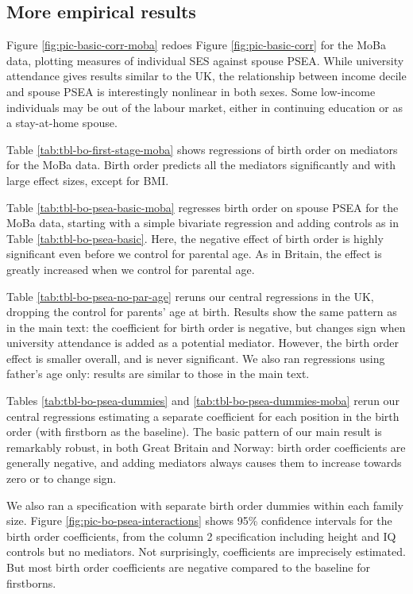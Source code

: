 \documentclass[
  12pt,
]{article}
\theoremstyle{definition}
\theoremstyle{definition}
\theoremstyle{definition}
\theoremstyle{definition}
\theoremstyle{remark}
\begin{document}
\FloatBarrier

\newpage

\hypertarget{more-empirical-results}{%
\subsection{More empirical results}\label{more-empirical-results}}

Figure \ref{fig:pic-basic-corr-moba} redoes Figure \ref{fig:pic-basic-corr}
for the MoBa data, plotting measures of individual SES against spouse PSEA.
While university attendance gives results similar to the UK, the relationship
between income decile and spouse PSEA is interestingly nonlinear in both
sexes. Some low-income individuals may be out of the labour market,
either in continuing education or as a stay-at-home spouse.

Table \ref{tab:tbl-bo-first-stage-moba} shows regressions of birth order on
mediators for the MoBa data. Birth order predicts all the mediators significantly
and with large effect sizes, except for BMI.

Table \ref{tab:tbl-bo-psea-basic-moba} regresses birth order on spouse PSEA
for the MoBa data, starting with a simple bivariate regression and adding
controls as in Table \ref{tab:tbl-bo-psea-basic}. Here,
the negative effect of birth order is highly significant even before we
control for parental age. As in Britain, the effect is greatly increased
when we control for parental age.

Table \ref{tab:tbl-bo-psea-no-par-age} reruns our central regressions in the
UK, dropping the control for parents' age at birth. Results show the same
pattern as in the main text: the coefficient for birth order is
negative, but changes sign when university attendance is added as a
potential mediator. However, the birth order effect is smaller overall,
and is never significant. We also ran regressions using father's age
only: results are similar to those in the main text.

Tables \ref{tab:tbl-bo-psea-dummies} and \ref{tab:tbl-bo-psea-dummies-moba}
rerun our central regressions estimating a separate coefficient for each position
in the birth order (with firstborn as the baseline). The basic pattern of our
main result is remarkably robust, in both Great Britain and Norway: birth order
coefficients are generally negative, and adding mediators always
causes them to increase towards zero or to change sign.

We also ran a specification with separate birth order dummies within
each family size. Figure \ref{fig:pic-bo-psea-interactions} shows 95\%
confidence intervals for the birth order coefficients, from the column 2
specification including height and IQ controls but no mediators. Not
surprisingly, coefficients are imprecisely estimated. But most birth
order coefficients are negative compared to the baseline for firstborns.
\end{document}
